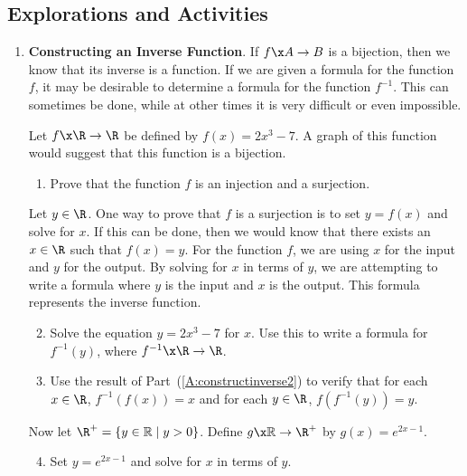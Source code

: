 \subsection*{Explorations and Activities}
\setcounter{oldenumi}{\theenumi}
\begin{enumerate} \setcounter{enumi}{\theoldenumi}
  \item \textbf{Constructing an Inverse Function}.  If $f\x A \to B$ is a bijection, then we know that its inverse is a function.  If  we are given a formula for the function  $f$, it may be desirable to determine a formula for the function  $f^{ - 1} $.  This can sometimes be done, while at other times it is very difficult or even impossible.

Let  $f\x \R \to \R$ be defined by  $f( x ) = 2x^3  - 7$.  A graph of this function would suggest that this function is a bijection.
\begin{enumerate}
  \item Prove that the function $f$ is an injection and a surjection.
\end{enumerate}
Let $y \in \R$.  One way to prove that $f$ is a surjection is to set $y = f( x )$ and solve for  $x$.  If this can be done, then we would know that there exists an $x \in \R$ such that $f(x) = y$.  
For the function $f$, we are using  $x$  for the input and  $y$  for the output.  
By solving for  $x$  in terms of  $y$, we are attempting to write a formula where   $y$  is the input and  $x$  is the output.  This formula represents the inverse function.
\begin{enumerate} \setcounter{enumii}{1}
  \item Solve the equation  $y = 2x^3  - 7$ for  $x$.  Use this to write a formula for  
$f^{ - 1} ( y )$, where  $f^{ - 1} \x \R \to \R$.  \label{A:constructinverse2}

\item Use the result of Part~(\ref{A:constructinverse2}) to verify that for each  
$x \in \R$,  $f^{ - 1} \!\left( {f( x )} \right) = x$ and for each  
$y \in \R$,  $f \!\left( {f^{ - 1} ( y )} \right) = y$.
\end{enumerate}

Now let $\R^+   = \left\{ { {y \in \mathbb{R}} \mid y > 0} \right\}$.  Define  $ g \x \mathbb{R} \to \R^+$ by  
$g( x ) = e^{2x - 1}$.

\begin{enumerate} \setcounter{enumii}{3}
  \item Set   $y = e^{2x - 1} $ and solve for  $x$  in terms of  $y$. 
\label{exer:constructinversea}


\end{enumerate}
\end{enumerate}
